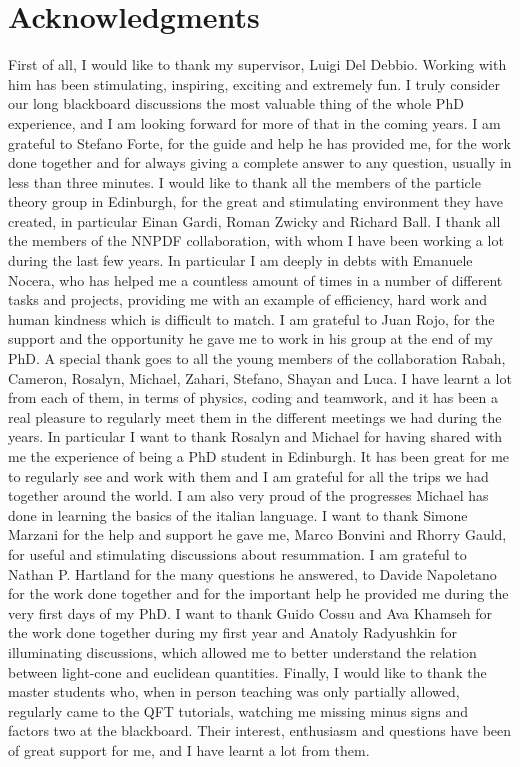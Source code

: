 \chapter*{Acknowledgments}
%
First of all, I would like to thank my supervisor, Luigi Del Debbio.
Working with him has been stimulating, inspiring, exciting and extremely fun.
I truly consider our long blackboard discussions the most valuable thing of the whole PhD experience, and
I am looking forward for more of that in the coming years.
%
I am grateful to Stefano Forte, for the guide and help he has provided me, for the work done together 
and for always giving a complete answer to any question, usually in less than three minutes.
I would like to thank all the members of the particle theory group in Edinburgh, for the 
great and stimulating environment they have created, in particular Einan Gardi, Roman Zwicky and Richard Ball. 
%
I thank all the members of the NNPDF collaboration, with whom I have been working a lot during the last
few years. In particular I am deeply in debts with Emanuele Nocera, who has helped me a countless amount of 
times in a number of different tasks and projects, providing me with an example of efficiency, hard work and human kindness which
is difficult to match. I am grateful to Juan Rojo, for the support and the opportunity he gave me to work in his group
at the end of my PhD.
%
A special thank goes to all the young members of the collaboration Rabah, Cameron, Rosalyn, Michael, Zahari, Stefano, Shayan
and Luca. I have learnt a lot from each of them, in terms of physics, coding and teamwork, and it has been a real pleasure
to regularly meet them in the different meetings we had during the years.
In particular I want to thank Rosalyn and Michael for having shared with me the experience of being a PhD student in Edinburgh.
It has been great for me to regularly see and work with them and I am grateful for all the trips
we had together around the world. 
I am also very proud of the progresses Michael has done in learning the basics of the italian language.
%
I want to thank Simone Marzani for the help and support he gave me, Marco Bonvini and Rhorry Gauld, for 
useful and stimulating discussions about resummation.  
%
I am grateful to Nathan P. Hartland for the many questions he answered, to
Davide Napoletano for the work done together and for the important help he provided me during the very first days of my PhD.
I want to thank Guido Cossu and Ava Khamseh for the work done together during my first year
and Anatoly Radyushkin for illuminating discussions, which allowed me to better understand the relation 
between light-cone and euclidean quantities. Finally, I would like to thank the master students who, when 
in person teaching was only partially allowed, regularly came to the QFT tutorials, watching me missing
minus signs and factors two at the blackboard.
Their interest, enthusiasm and questions have been of great support for me, and I have learnt a lot from them. 


